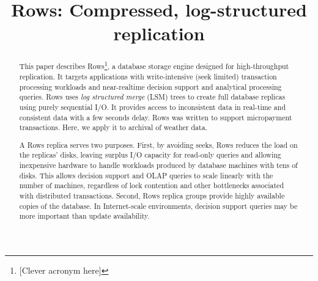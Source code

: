 \documentclass{sig-alternate-sigmod08}
\newcommand{\rows}{Rows\xspace}
\begin{document}
%

\title{{\ttlit \rows}: Compressed, log-structured replication}
%
%
\author{}
\maketitle
\begin{abstract}
This paper describes \rows\footnote{[Clever acronym here]}, a database
storage engine designed for high-throughput replication.  It targets
applications with write-intensive (seek limited) transaction
processing workloads and near-realtime decision support and analytical
processing queries.  \rows uses {\em log structured merge} (LSM) trees
to create full database replicas using purely sequential I/O.  It
provides access to inconsistent data in real-time and consistent data
with a few seconds delay.  \rows was written to support micropayment
transactions.  Here, we apply it to archival of weather data.

A \rows replica serves two purposes.  First, by avoiding seeks, \rows
reduces the load on the replicas' disks, leaving surplus I/O capacity
for read-only queries and allowing inexpensive hardware to handle
workloads produced by database machines with tens of disks.  This
allows decision support and OLAP queries to scale linearly with the
number of machines, regardless of lock contention and other
bottlenecks associated with distributed transactions.  Second, \rows
replica groups provide highly available copies of the database.  In
Internet-scale environments, decision support queries may be more
important than update availability.



\end{abstract}
\end{document}
